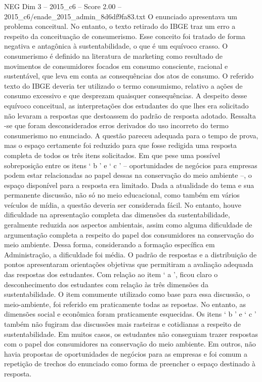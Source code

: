 \begin{textsample}{NEG Dim 3 – 2015\_c6 – Score 2.00 – 2015\_c6/enade\_2015\_admin\_8d6df9fa83.txt}
O enunciado apresentava um problema conceitual.
No entanto, o texto retirado do IBGE traz um erro a respeito da conceituação de consumerismo.
Esse conceito foi tratado de forma negativa e antagônica à sustentabilidade, o que é um equívoco crasso.
O consumerismo é definido na literatura de marketing como resultado de movimentos de consumidores focados em consumo consciente, racional e sustentável, que leva em conta as consequências dos atos de consumo.
O referido texto do IBGE deveria ter utilizado o termo consumismo, relativo a ações de consumo excessivo e que desprezam quaisquer consequências.
A despeito desse equívoco conceitual, as interpretações dos estudantes do que lhes era solicitado não levaram a respostas que destoassem do padrão de resposta adotado.
Ressalta -se que foram desconsiderados erros derivados do uso incorreto do termo consumerismo no enunciado.
A questão pareceu adequada para o tempo de prova, mas o espaço certamente foi reduzido para que fosse redigida uma resposta completa de todos os três itens solicitados.
Em que pese uma possível sobreposição entre os itens ‘ b ’ e ‘ c ’ – oportunidades de negócios para empresas podem estar relacionadas ao papel dessas na conservação do meio ambiente –, o espaço disponível para a resposta era limitado.
Dada a atualidade do tema e sua permanente discussão, não só no meio educacional, como também em vários veículos de mídia, a questão deveria ser considerada fácil.
No entanto, houve dificuldade na apresentação completa das dimensões da sustentabilidade, geralmente reduzida aos aspectos ambientais, assim como alguma dificuldade de argumentação completa a respeito do papel dos consumidores na conservação do meio ambiente.
Dessa forma, considerando a formação específica em Administração, a dificuldade foi média.
O padrão de respostas e a distribuição de pontos apresentaram orientações objetivas que permitiram a avaliação adequada das respostas dos estudantes.
Com relação ao item ‘ a ’, ficou claro o desconhecimento dos estudantes com relação às três dimensões da sustentabilidade.
O item comumente utilizado como base para essa discussão, o meio-ambiente, foi referido em praticamente todas as repostas.
No entanto, as dimensões social e econômica foram praticamente esquecidas.
Os itens ‘ b ’ e ‘ c ’ também não fugiram das discussões mais rasteiras e cotidianas a respeito de sustentabilidade.
Em muitos casos, os estudantes não conseguiam trazer respostas com o papel dos consumidores na conservação do meio ambiente.
Em outros, não havia propostas de oportunidades de negócios para as empresas e foi comum a repetição de trechos do enunciado como forma de preencher o espaço destinado à resposta.

\end{textsample}
